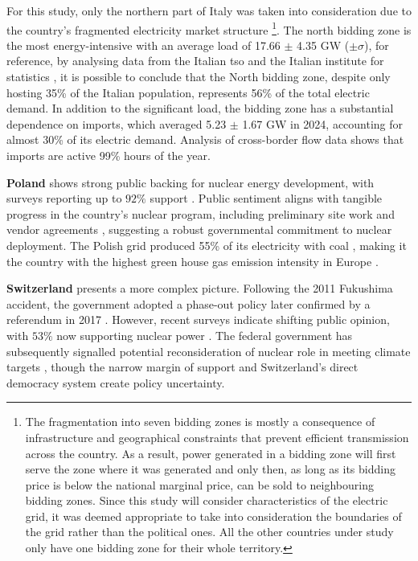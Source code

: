 For this study, only the northern part of Italy was taken into consideration due to the country's fragmented electricity market structure \footnote{The fragmentation into seven bidding zones is mostly a consequence of infrastructure and geographical constraints that prevent efficient transmission across the country. As a result, power generated in a bidding zone will first serve the zone where it was generated and only then, as long as its bidding price is below the national marginal price, can be sold to neighbouring bidding zones. Since this study will consider characteristics of the electric grid, it was deemed appropriate to take into consideration the boundaries of the grid rather than the political ones. All the other countries under study only have one bidding zone for their whole territory.}. The north bidding zone is the most energy-intensive with an average load of 17.66 $\pm$ 4.35 GW ($\pm \sigma$), for reference, by analysing data from the Italian \gls{tso} \cite{Terna_Italian_Electricity_Demand_2024} and the Italian institute for statistics \cite{ISTAT_POS_2024}, it is possible to conclude that the North bidding zone, despite only hosting 35\% of the Italian population, represents 56\% of the total electric demand. In addition to the significant load, the bidding zone has a substantial dependence on imports, which averaged 5.23 $\pm$ 1.67 GW in 2024, accounting for almost 30\% of its electric demand. Analysis of cross-border flow data shows that imports are active 99\% hours of the year.

\textbf{Poland} shows strong public backing for nuclear energy development, with surveys reporting up to $92\%$ support \cite{NucNet_Poland_Nuclear_Support_2024}. Public sentiment aligns with tangible progress in the country's nuclear program, including preliminary site work and vendor agreements \cite{Westinghouse_Poland_Nuclear_2025,WorldNuclearNews_Poland_Preliminary_Works_2025}, suggesting a robust governmental commitment to nuclear deployment. The Polish grid produced 55\% of its electricity with coal \cite{IEA_Electricity_2024}, making it the country with the highest green house gas emission intensity in Europe \cite{ElectricityMaps_CarbonIntensity_2024}.

\textbf{Switzerland} presents a more complex picture. Following the 2011 Fukushima accident, the government adopted a phase-out policy later confirmed by a referendum in 2017 \cite{WorldNuclear_Switzerland_Profile_2025}. However, recent surveys indicate shifting public opinion, with $53\%$ now supporting nuclear power \cite{Euronuclear_Swiss_Nuclear_Poll_2023,NucNet_Nuclear_Support_Survey_2023,WorldNuclearNews_Swiss_Nuclear_Poll_2023}. The federal government has subsequently signalled potential reconsideration of nuclear role in meeting climate targets \cite{swissinfo_Nuclear_Power_Switzerland_2025}, though the narrow margin of support and Switzerland's direct democracy system create policy uncertainty. 


